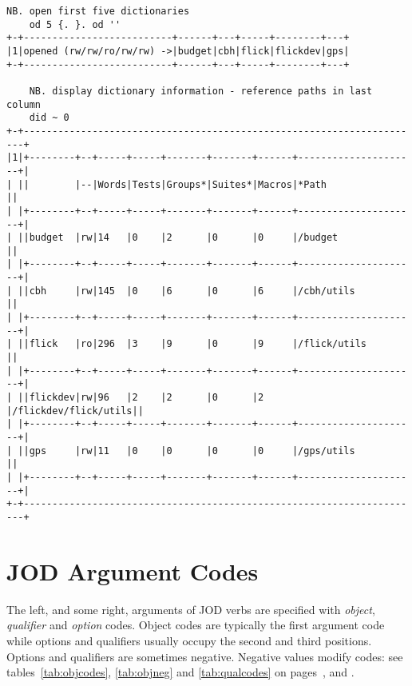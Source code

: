 \begin{lstlisting}[frame=single,framerule=0pt,basicstyle=\ttfamily\footnotesize]
    NB. open first five dictionaries 
    od 5 {. }. od ''
+-+--------------------------+------+---+-----+--------+---+
|1|opened (rw/rw/ro/rw/rw) ->|budget|cbh|flick|flickdev|gps|
+-+--------------------------+------+---+-----+--------+---+

    NB. display dictionary information - reference paths in last column
    did ~ 0
+-+----------------------------------------------------------------------+
|1|+--------+--+-----+-----+-------+-------+------+---------------------+|
| ||        |--|Words|Tests|Groups*|Suites*|Macros|*Path                ||
| |+--------+--+-----+-----+-------+-------+------+---------------------+|
| ||budget  |rw|14   |0    |2      |0      |0     |/budget              ||
| |+--------+--+-----+-----+-------+-------+------+---------------------+|
| ||cbh     |rw|145  |0    |6      |0      |6     |/cbh/utils           ||
| |+--------+--+-----+-----+-------+-------+------+---------------------+|
| ||flick   |ro|296  |3    |9      |0      |9     |/flick/utils         ||
| |+--------+--+-----+-----+-------+-------+------+---------------------+|
| ||flickdev|rw|96   |2    |2      |0      |2     |/flickdev/flick/utils||
| |+--------+--+-----+-----+-------+-------+------+---------------------+|
| ||gps     |rw|11   |0    |0      |0      |0     |/gps/utils           ||
| |+--------+--+-----+-----+-------+-------+------+---------------------+|
+-+----------------------------------------------------------------------+
\end{lstlisting}
   
   \newpage
   \section{JOD Argument Codes}\label{ap:objqualcodes}

The left, and some right, arguments of JOD verbs are specified with \emph{object}, \emph{qualifier} and \emph{option} codes. Object codes are typically the first argument code while options and qualifiers usually occupy the second and third positions. Options and qualifiers are sometimes negative. Negative values modify codes: see tables~\ref{tab:objcodes}, \ref{tab:objneg} and
\ref{tab:qualcodes} on pages~\pageref{tab:objcodes},  \pageref{tab:objneg} and \pageref{tab:qualcodes}.

